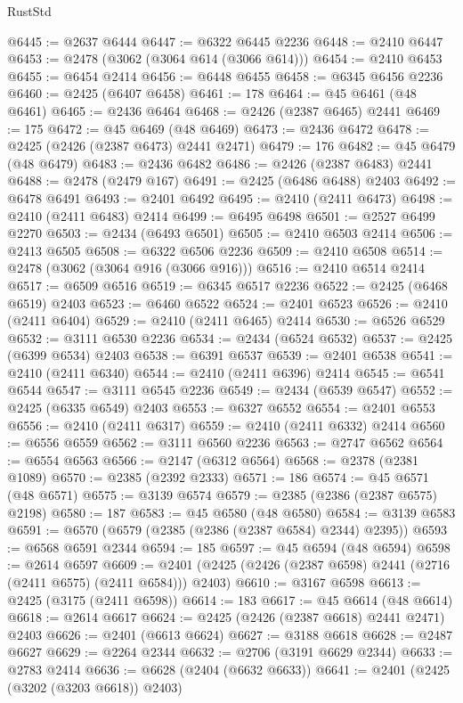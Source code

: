\begin{lexlean}{RustStd}
\begin{coremodule}
@6445 := @2637 @6444
@6447 := @6322 @6445 @2236
@6448 := @2410 @6447
@6453 := @2478 (@3062 (@3064 @614 (@3066 @614)))
@6454 := @2410 @6453
@6455 := @6454 @2414
@6456 := @6448 @6455
@6458 := @6345 @6456 @2236
@6460 := @2425 (@6407 @6458)
@6461 := 178
@6464 := @45 @6461 (@48 @6461)
@6465 := @2436 @6464
@6468 := @2426 (@2387 @6465) @2441
@6469 := 175
@6472 := @45 @6469 (@48 @6469)
@6473 := @2436 @6472
@6478 := @2425 (@2426 (@2387 @6473) @2441 @2471)
@6479 := 176
@6482 := @45 @6479 (@48 @6479)
@6483 := @2436 @6482
@6486 := @2426 (@2387 @6483) @2441
@6488 := @2478 (@2479 @167)
@6491 := @2425 (@6486 @6488) @2403
@6492 := @6478 @6491
@6493 := @2401 @6492
@6495 := @2410 (@2411 @6473)
@6498 := @2410 (@2411 @6483) @2414
@6499 := @6495 @6498
@6501 := @2527 @6499 @2270
@6503 := @2434 (@6493 @6501)
@6505 := @2410 @6503 @2414
@6506 := @2413 @6505
@6508 := @6322 @6506 @2236
@6509 := @2410 @6508
@6514 := @2478 (@3062 (@3064 @916 (@3066 @916)))
@6516 := @2410 @6514 @2414
@6517 := @6509 @6516
@6519 := @6345 @6517 @2236
@6522 := @2425 (@6468 @6519) @2403
@6523 := @6460 @6522
@6524 := @2401 @6523
@6526 := @2410 (@2411 @6404)
@6529 := @2410 (@2411 @6465) @2414
@6530 := @6526 @6529
@6532 := @3111 @6530 @2236
@6534 := @2434 (@6524 @6532)
@6537 := @2425 (@6399 @6534) @2403
@6538 := @6391 @6537
@6539 := @2401 @6538
@6541 := @2410 (@2411 @6340)
@6544 := @2410 (@2411 @6396) @2414
@6545 := @6541 @6544
@6547 := @3111 @6545 @2236
@6549 := @2434 (@6539 @6547)
@6552 := @2425 (@6335 @6549) @2403
@6553 := @6327 @6552
@6554 := @2401 @6553
@6556 := @2410 (@2411 @6317)
@6559 := @2410 (@2411 @6332) @2414
@6560 := @6556 @6559
@6562 := @3111 @6560 @2236
@6563 := @2747 @6562
@6564 := @6554 @6563
@6566 := @2147 (@6312 @6564)
@6568 := @2378 (@2381 @1089)
@6570 := @2385 (@2392 @2333)
@6571 := 186
@6574 := @45 @6571 (@48 @6571)
@6575 := @3139 @6574
@6579 := @2385 (@2386 (@2387 @6575) @2198)
@6580 := 187
@6583 := @45 @6580 (@48 @6580)
@6584 := @3139 @6583
@6591 := @6570 (@6579 (@2385 (@2386 (@2387 @6584) @2344) @2395))
@6593 := @6568 @6591 @2344
@6594 := 185
@6597 := @45 @6594 (@48 @6594)
@6598 := @2614 @6597
@6609 := @2401 (@2425 (@2426 (@2387 @6598) @2441 (@2716 (@2411 @6575) (@2411 @6584))) @2403)
@6610 := @3167 @6598
@6613 := @2425 (@3175 (@2411 @6598))
@6614 := 183
@6617 := @45 @6614 (@48 @6614)
@6618 := @2614 @6617
@6624 := @2425 (@2426 (@2387 @6618) @2441 @2471) @2403
@6626 := @2401 (@6613 @6624)
@6627 := @3188 @6618
@6628 := @2487 @6627
@6629 := @2264 @2344
@6632 := @2706 (@3191 @6629 @2344)
@6633 := @2783 @2414
@6636 := @6628 (@2404 (@6632 @6633))
@6641 := @2401 (@2425 (@3202 (@3203 @6618)) @2403)

\end{coremodule}
\end{lexlean}
